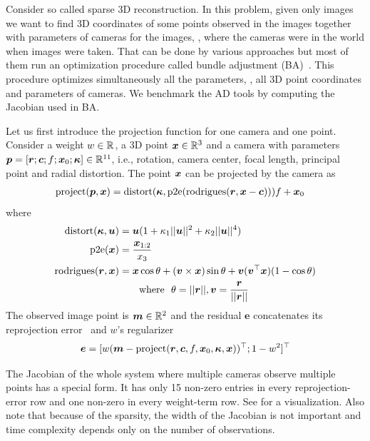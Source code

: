 \documentclass[suppldata]{article}
\begin{document}
Consider so called sparse 3D reconstruction. In this problem, given only images we want to find 3D coordinates of some points observed in the images together with parameters of cameras for the images, \ie, where the cameras were in the world when images were taken. That can be done by various approaches but most of them run an optimization procedure called bundle adjustment (BA)~\cite{Triggs99ba,ceres}. This procedure optimizes  simultaneously all the parameters, \ie, all 3D point coordinates and parameters of cameras. We benchmark the AD tools by computing the Jacobian used in BA.

Let us first introduce the projection function for one camera and one point. Consider a weight $w \in {\mathbb R}$, a 3D point $\bm{x} \in {\mathbb R}^3$ and a camera with parameters $\bm{p} = [\bm{r};\bm{c};f;\bm{x}_0;\bm{\kappa}] \in {\mathbb R}^{11}$, i.e., rotation, camera center, focal length, principal point and radial distortion. The point $\bm{x}$ can be projected by the camera as
\begin{align}
\operatorname{project}(\bm{p},\bm{x}) &= \operatorname{distort}(\bm{\kappa},\operatorname{p2e}(\operatorname{rodrigues}(\bm{r},\bm{x}-\bm{c})))f + \bm{x}_0 
\end{align}   
where
\begin{align}   
\operatorname{distort}(\bm{\kappa},\bm{u}) &= \bm{u}(1 + \kappa_1 ||\bm{u}||^2 + \kappa_2 ||\bm{u}||^4) \\
\operatorname{p2e}(\bm{x}) &= \frac{\bm{x}_{1:2}}{x_3} \\
\operatorname{rodrigues}(\bm{r},\bm{x}) &= \bm{x} \cos{\theta} + (\bm{v} \times \bm{x}) \sin{\theta} + \bm{v}(\bm{v}^\top\bm{x})(1 - \cos{\theta}) \\
& \qquad \text{where} ~~ \theta = ||\bm{r}||, \bm{v} = \frac{\bm{r}}{||\bm{r}||}
\label{eq:rodrigues}
\end{align}   
The observed image point is $\bm{m} \in {\mathbb R}^2$ and the residual $\bm e$ concatenates its reprojection error~\cite{HZ04} and $w$'s regularizer
\begin{equation}
\label{eq:residual}
\bm{e} = [w (\bm{m} - \operatorname{project}(\bm{r},\bm{c},f,\bm{x}_0,\bm{\kappa},\bm{x}))^\top;
1 - w^2]^\top
\end{equation}

The Jacobian of the whole system where multiple cameras observe multiple points has a special form. It has only 15 non-zero entries in every reprojection-error row and one non-zero in every weight-term row. See  for a visualization.  Also note that because of the sparsity, the width of the Jacobian is not important and time complexity depends only on the number of observations.
\end{document}
